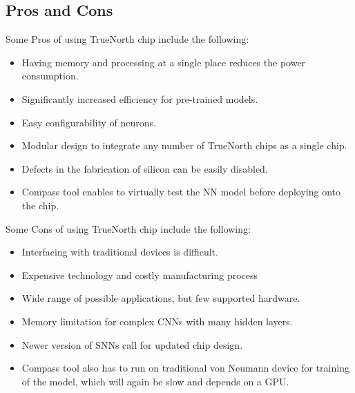 \documentclass[11pt,twoside]{article}
\begin{document}
\subsection{Pros and Cons}
Some Pros of using TrueNorth chip include the following:
\begin{itemize}
  \item Having memory and processing at a single place reduces the power consumption.\cite{akopyan2015truenorth, hwu2017self, mead1990neuromorphic, indiveri2011neuromorphic} 
  \item Significantly increased efficiency for pre-trained models. \cite{akopyan2015truenorth, pastur2016deep}
  \item Easy configurability of neurons.\cite{akopyan2015truenorth, hwu2017self} 
  \item Modular design to integrate any number of TrueNorth chips as a single chip.\cite{akopyan2015truenorth}
  \item Defects in the fabrication of silicon can be easily disabled. \cite{akopyan2015truenorth} 
  \item Compass tool enables to virtually test the NN model before deploying onto the chip. \cite{akopyan2015truenorth} 
\end{itemize}

\par
Some Cons of using TrueNorth chip include the following:
\begin{itemize}
  \item Interfacing with traditional devices is difficult. \cite{pastur2016deep, agarwal2015era} 
  \item Expensive technology and costly manufacturing process \cite{akopyan2015truenorth, agarwal2015era}
  \item Wide range of possible applications, but few supported hardware.\cite{agarwal2015era} 
  \item Memory limitation for complex CNNs with many hidden layers. \cite{diehl2016conversion} 
  \item Newer version of SNNs call for updated chip design. \cite{bellec2018long}
  \item Compass tool also has to run on traditional von Neumann device for training of the model, which will again be slow and depends on a GPU. \cite{agarwal2015era} 
\end{itemize}
\end{document}

